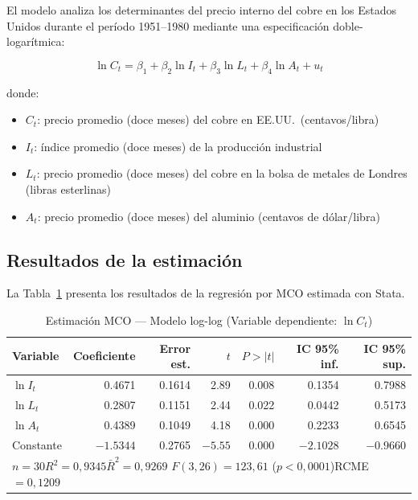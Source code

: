 \documentclass[12pt,a4paper]{article}
\begin{document}
El modelo analiza los determinantes del precio interno del cobre en los
Estados Unidos durante el período 1951--1980 mediante una especificación
doble-logarítmica:

\begin{equation}
  \ln C_t = \beta_1 + \beta_2\ln I_t + \beta_3\ln L_t + \beta_4\ln A_t + u_t
  \label{eq:modelo}
\end{equation}

\noindent donde:
\begin{itemize}[leftmargin=2cm]
  \item $C_t$: precio promedio (doce meses) del cobre en EE.UU.\ (centavos/libra)
  \item $I_t$: índice promedio (doce meses) de la producción industrial
  \item $L_t$: precio promedio (doce meses) del cobre en la bolsa de metales
               de Londres (libras esterlinas)
  \item $A_t$: precio promedio (doce meses) del aluminio (centavos de dólar/libra)
\end{itemize}

\subsection{Resultados de la estimación}

La Tabla~\ref{tab:ols} presenta los resultados de la regresión por MCO
estimada con Stata.

\begin{table}[H]
  \centering
  \caption{Estimación MCO --- Modelo log-log (Variable dependiente: $\ln C_t$)}
  \label{tab:ols}
  \small
  \begin{tabular}{lrrrrrr}
    \toprule
    Variable & Coeficiente & Error est. & $t$ & $P>|t|$ & IC 95\% inf. & IC 95\% sup. \\
    \midrule
    $\ln I_t$    & 0.4671 & 0.1614 & 2.89 & 0.008 & 0.1354 & 0.7988 \\
    $\ln L_t$    & 0.2807 & 0.1151 & 2.44 & 0.022 & 0.0442 & 0.5173 \\
    $\ln A_t$    & 0.4389 & 0.1049 & 4.18 & 0.000 & 0.2233 & 0.6545 \\
    Constante    & $-1.5344$ & 0.2765 & $-5.55$ & 0.000 & $-2.1028$ & $-0.9660$ \\
    \midrule
    \multicolumn{7}{l}{$n=30$\quad $R^2=0{,}9345$\quad $\bar{R}^2=0{,}9269$\quad
      $F(3,26)=123{,}61$ ($p<0{,}0001$)\quad RCME $=0{,}1209$} \\
    \bottomrule
  \end{tabular}
\end{table}
\end{document}
